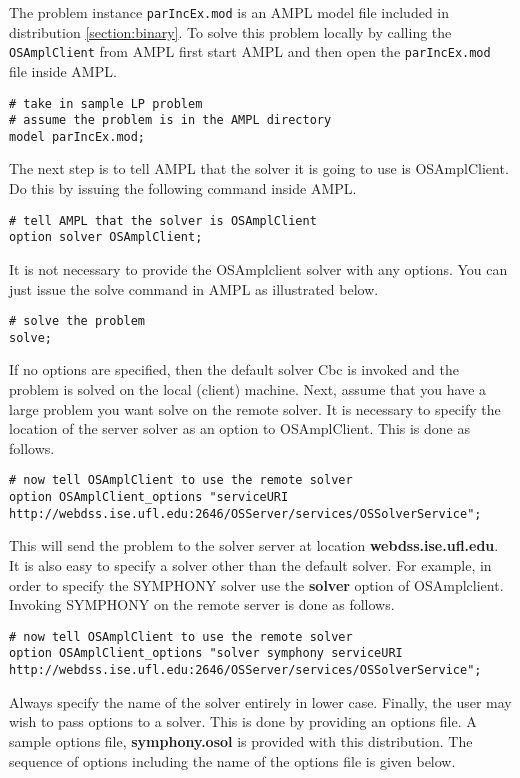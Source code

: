 \documentclass[11pt]{article}
\renewcommand{\{}{{\char"7B}}
\renewcommand{\}}{{\char"7D}}
\renewcommand{\^}{{\char"0D}}
\renewcommand{\'}{{\char"0D}}
\begin{document}
The  problem instance {\tt parIncEx.mod} is an AMPL model file included in distribution  \ref{section:binary}.  To solve this problem locally by calling the {\tt OSAmplClient} from AMPL first start AMPL and then open the {\tt parIncEx.mod} file inside AMPL.

\begin{verbatim}
# take in sample LP problem
# assume the problem is in the AMPL directory
model parIncEx.mod;
\end{verbatim}

The next step is to tell AMPL that the solver it is going to use is OSAmplClient. Do this by issuing the following command inside AMPL.

\begin{verbatim}
# tell AMPL that the solver is OSAmplClient
option solver OSAmplClient;
\end{verbatim}

It is not necessary to provide the  OSAmplclient solver with any options. You can just issue the solve command in AMPL as illustrated below.  

\begin{verbatim}
# solve the problem
solve;
\end{verbatim}

If no options are specified, then the default solver Cbc is invoked and the problem is solved on the local (client) machine.  Next, assume that you have a large problem you want solve on the remote solver. It is necessary to specify the location of the server solver as an option to OSAmplClient. This is done as follows.
 
{\tiny 
\begin{verbatim}
# now tell OSAmplClient to use the remote solver
option OSAmplClient_options "serviceURI http://webdss.ise.ufl.edu:2646/OSServer/services/OSSolverService";
\end{verbatim}
}

This will send the problem to the solver server at location {\bf webdss.ise.ufl.edu}.  It is also easy to specify a solver other than the default solver. For example, in order to specify the SYMPHONY solver use the {\bf solver} option of OSAmplclient.   Invoking  SYMPHONY on the remote server is done as follows.


{\tiny 
\begin{verbatim}
# now tell OSAmplClient to use the remote solver
option OSAmplClient_options "solver symphony serviceURI http://webdss.ise.ufl.edu:2646/OSServer/services/OSSolverService";
\end{verbatim}
}
Always specify the name of the solver entirely in lower case.  Finally, the user may wish to pass options to a solver. This is done by providing an options file. A sample options file, {\bf symphony.osol} is provided with this distribution.  The sequence of options including the name of the options file is given below.
\end{document}

